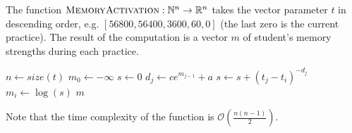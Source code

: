 \begin{algorithm}
  \caption{The function $\textsc{MemoryActivation}: \mathbb{N}^n \rightarrow \mathbb{R}^n$ takes the vector parameter $t$ in descending order, e.g. $[56800, 56400, 3600, 60, 0]$ (the last zero is the current practice). The result of the computation is a vector $m$ of student's memory strengths during each practice.}
  \label{alg-memory-activation}
  \begin{algorithmic}[1]
      \State $n \gets size(t)$
      \State $m_0 \gets -\infty$
        \State $s \gets 0$
          \State $d_j \gets ce^{m_{j-1}} + a$
          \State $s \gets s + (t_j - t_i)^{-d_j}$
        \EndFor
        \State $m_i \gets \log(s)$
      \EndFor
      \State \Return $m$
    \EndFunction
  \end{algorithmic}
\end{algorithm}

Note that the time complexity of the function is $\mathcal{O}\left(\frac{n(n-1)}{2}\right)$.
